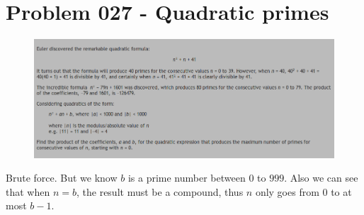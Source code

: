 \section{Problem 027 - Quadratic primes}
\begin{prob}
	\begin{figure}[htb!]
		\begin{center}
			\includegraphics[scale = 0.4]{pic/027.png}
		\end{center}
	\end{figure}
\end{prob}
\begin{sol}
Brute force. But we know $b$ is a prime number between $0$ to $999$. Also we can see that when $n = b$, the result must be a compound, thus $n$ only goes from $0$ to at most $b - 1$.
\end{sol}

